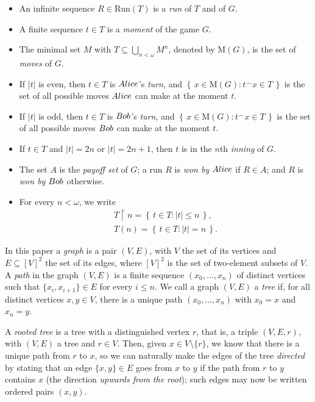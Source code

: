 \documentclass[12pt]{amsart}
\theoremstyle{definition}
\newcommand{\set}[1]{\left\{\, {#1} \,\right\}}
\newcommand{\seq}[1]{{\left( {#1} \right)}}
\newcommand{\ali}{\textup{\textmd{\textsc{Alice}}}}
\newcommand{\bob}{\textup{\textmd{\textsc{Bob}}}}
\newcommand{\Run}{{\mathrm{Run}}}
\newcommand{\M}{\mathrm{M}}
\DeclareMathOperator{\restrict}{\upharpoonright}
\begin{document}
\begin{itemize}
	\item An infinite sequence $R\in \Run(T)$ is a \textit{run} of $T$ and of $G$.
	
	\item A finite sequence $t\in T$ is a \textit{moment} of the game $G$. 
	
	\item The minimal set $M$ with $T\subseteq \bigcup_{n<\omega}{M^n}$, denoted by $\M(G)$, is the set of \textit{moves} of $G$.
	
	\item If $|t|$  is even, then $t\in T$ is $\ali$'s \textit{turn}, and $\set{x\in \M(G): t^\smallfrown x\in T}$ is the set of all possible moves $\ali$ can make at the moment $t$.
	
	\item If $|t|$ is odd, then $t\in T$ is $\bob$'s \textit{turn}, and $\set{x\in \M(G): t^\smallfrown x\in T}$ is the set of all possible moves $\bob$ can make at the moment $t$.
	
	\item If $t\in T$  and $|t|=2n$ or $|t|=2n+1$, then $t$ is in the $n$th \textit{inning} of $G$.
	
	\item The set $A$ is the \textit{payoff set} of $G$; a run $R$ is  \textit{won by} $\ali$ if $R\in A$; and $R$ is \textit{won by $\bob$} otherwise.
	
	\item For every $n<\omega$, we write 
	\begin{gather*}
		T\restrict n = \set{t\in T: |t|\le n},\\
		{T(n)} = \set{t\in T: |t| = n}.
	\end{gather*}
\end{itemize}	

In this paper a \textit{graph} is a pair $(V,E)$, with $V$ the set of its vertices and $E\subseteq[V]^2$ the set of its edges, where $[V]^2$ is the set of two-element subsets of $V$.
A \textit{path} in the graph $(V,E)$ is a finite sequence $\seq{x_0, \dotsc, x_n}$ of distinct vertices such that $\{x_i,x_{i+1}\}\in E$ for every $i\le n$. We call a graph $(V,E)$ a \textit{tree} if, for all distinct vertices $x,y\in V$, there is a unique path $\seq{x_0, \dotsc, x_n}$ with $x_0 = x$ and $x_n = y$.

A \textit{rooted tree} is a tree with a distinguished vertex $r$, that is, a triple $(V,E,r)$, with $(V,E)$ a tree and $r\in V$. Then, given $x\in V\setminus \{r\}$, we know that there is a unique path from $r$ to $x$, so we can naturally make the edges of the tree \textit{directed} by stating that an edge $\{x,y\}\in E$ goes from $x$ to $y$ if the path from $r$ to $y$ contains $x$ (the direction \textit{upwards from the root}); such edges may now be written ordered pairs $(x,y)$. 
\end{document}
